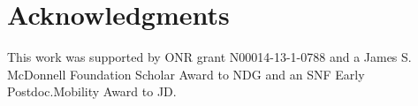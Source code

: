 \documentclass[10pt,letterpaper]{article}
\begin{document}
\section{\bf Acknowledgments}

This work was supported by ONR grant N00014-13-1-0788 and a James S. McDonnell Foundation Scholar Award to NDG and an SNF Early Postdoc.Mobility Award to JD.

\small




\setlength{\bibleftmargin}{.125in}
\setlength{\bibindent}{-\bibleftmargin}


\end{document}
